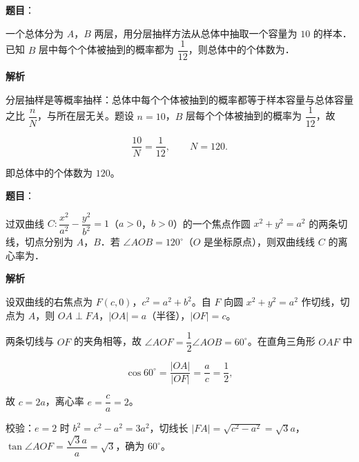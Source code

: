 \begin{answer}

\textbf{题目}：

一个总体分为 $A$，$B$ 两层，用分层抽样方法从总体中抽取一个容量为 $10$ 的样本．已知 $B$ 层中每个个体被抽到的概率都为 $\dfrac1{12}$，则总体中的个体数为\gkblank{}．

\textbf{解析}

分层抽样是等概率抽样：总体中每个个体被抽到的概率都等于样本容量与总体容量之比 $\dfrac{n}{N}$，与所在层无关。题设 $n=10$，$B$ 层每个个体被抽到的概率为 $\dfrac1{12}$，故

\nopagebreak[4]
\[\frac{10}{N}=\frac1{12},\qquad N=120.\]

即总体中的个体数为 $120$。


\end{answer}
\begin{answer}

\textbf{题目}：

过双曲线 $C:\dfrac{x^2}{a^2}-\dfrac{y^2}{b^2}=1$（$a>0$，$b>0$）的一个焦点作圆 $x^2+y^2=a^2$ 的两条切线，切点分别为 $A$，$B$．若 $\angle AOB=120^\circ$（$O$ 是坐标原点），则双曲线线 $C$ 的离心率为\gkblank{}．

\textbf{解析}

设双曲线的右焦点为 $F(c,0)$，$c^2=a^2+b^2$。自 $F$ 向圆 $x^2+y^2=a^2$ 作切线，切点为 $A$，则 $OA\perp FA$，$|OA|=a$（半径），$|OF|=c$。

两条切线与 $OF$ 的夹角相等，故 $\angle AOF=\dfrac12\angle AOB=60^\circ$。在直角三角形 $OAF$ 中

\nopagebreak[4]
\[\cos60^\circ=\frac{|OA|}{|OF|}=\frac ac=\frac12,\]

故 $c=2a$，离心率 $e=\dfrac ca=2$。

校验：$e=2$ 时 $b^2=c^2-a^2=3a^2$，切线长 $|FA|=\sqrt{c^2-a^2}=\sqrt3a$，$\tan\angle AOF=\dfrac{\sqrt3a}{a}=\sqrt3$，确为 $60^\circ$。


\end{answer}
